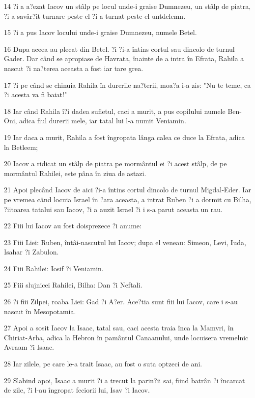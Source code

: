\par 14 ?i a a?ezat Iacov un stâlp pe locul unde-i graise Dumnezeu, un stâlp de piatra, ?i a savâr?it turnare peste el ?i a turnat peste el untdelemn.
\par 15 ?i a pus Iacov locului unde-i graise Dumnezeu, numele Betel.
\par 16 Dupa aceea au plecat din Betel. ?i ?i-a întins cortul sau dincolo de turnul Gader. Dar când se apropiase de Havrata, înainte de a intra în Efrata, Rahila a nascut ?i na?terea aceasta a fost iar tare grea.
\par 17 ?i pe când se chinuia Rahila în durerile na?terii, moa?a i-a zis: "Nu te teme, ca ?i acesta va fi baiat!"
\par 18 Iar când Rahila î?i dadea sufletul, caci a murit, a pus copilului numele Ben-Oni, adica fiul durerii mele, iar tatal lui l-a numit Veniamin.
\par 19 Iar daca a murit, Rahila a fost îngropata lânga calea ce duce la Efrata, adica la Betleem;
\par 20 Iacov a ridicat un stâlp de piatra pe mormântul ei ?i acest stâlp, de pe mormântul Rahilei, este pâna în ziua de astazi.
\par 21 Apoi plecând Iacov de aici ?i-a întins cortul dincolo de turnul Migdal-Eder. Iar pe vremea când locuia Israel în ?ara aceasta, a intrat Ruben ?i a dormit cu Bilha, ?iitoarea tatalui sau Iacov, ?i a auzit Israel ?i i s-a parut aceasta un rau.
\par 22 Fiii lui Iacov au fost doisprezece ?i anume:
\par 23 Fiii Liei: Ruben, întâi-nascutul lui Iacov; dupa el veneau: Simeon, Levi, Iuda, Isahar ?i Zabulon.
\par 24 Fiii Rahilei: Iosif ?i Veniamin.
\par 25 Fiii slujnicei Rahilei, Bilha: Dan ?i Neftali.
\par 26 ?i fiii Zilpei, roaba Liei: Gad ?i A?er. Ace?tia sunt fiii lui Iacov, care i s-au nascut în Mesopotamia.
\par 27 Apoi a sosit Iacov la Isaac, tatal sau, caci acesta traia înca la Mamvri, în Chiriat-Arba, adica la Hebron în pamântul Canaanului, unde locuisera vremelnic Avraam ?i Isaac.
\par 28 Iar zilele, pe care le-a trait Isaac, au fost o suta optzeci de ani.
\par 29 Slabind apoi, Isaac a murit ?i a trecut la parin?ii sai, fiind batrân ?i încarcat de zile, ?i l-au îngropat feciorii lui, Isav ?i Iacov.

